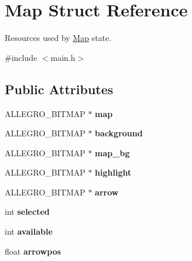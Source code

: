 \hypertarget{structMap}{\section{\-Map \-Struct \-Reference}
\label{structMap}
}


\-Resources used by \hyperlink{structMap}{\-Map} state.  




{\ttfamily \#include $<$main.\-h$>$}

\subsection*{\-Public \-Attributes}
\begin{DoxyCompactItemize}
\item 
\hypertarget{structMap_abaf70186fbb2b4b047b8350e3ec5347c}{\-A\-L\-L\-E\-G\-R\-O\-\_\-\-B\-I\-T\-M\-A\-P $\ast$ {\bfseries map}}\label{structMap_abaf70186fbb2b4b047b8350e3ec5347c}

\item 
\hypertarget{structMap_ad8340de76c0aef49c416f4314c15464f}{\-A\-L\-L\-E\-G\-R\-O\-\_\-\-B\-I\-T\-M\-A\-P $\ast$ {\bfseries background}}\label{structMap_ad8340de76c0aef49c416f4314c15464f}

\item 
\hypertarget{structMap_a36e0974add88da1c1c17062802c48559}{\-A\-L\-L\-E\-G\-R\-O\-\_\-\-B\-I\-T\-M\-A\-P $\ast$ {\bfseries map\-\_\-bg}}\label{structMap_a36e0974add88da1c1c17062802c48559}

\item 
\hypertarget{structMap_adccebcf55883a7b2a4d99df6f19be0e8}{\-A\-L\-L\-E\-G\-R\-O\-\_\-\-B\-I\-T\-M\-A\-P $\ast$ {\bfseries highlight}}\label{structMap_adccebcf55883a7b2a4d99df6f19be0e8}

\item 
\hypertarget{structMap_a90d5715479673c41e86f324d1955c2ad}{\-A\-L\-L\-E\-G\-R\-O\-\_\-\-B\-I\-T\-M\-A\-P $\ast$ {\bfseries arrow}}\label{structMap_a90d5715479673c41e86f324d1955c2ad}

\item 
\hypertarget{structMap_a07b3269191a003d517977da3adc7f0a4}{int {\bfseries selected}}\label{structMap_a07b3269191a003d517977da3adc7f0a4}

\item 
\hypertarget{structMap_aa000e129cf19d6d6d9a78cfce0ef58fc}{int {\bfseries available}}\label{structMap_aa000e129cf19d6d6d9a78cfce0ef58fc}

\item 
\hypertarget{structMap_a4f395f7bdf7bc0782e29e996e87237bb}{float {\bfseries arrowpos}}\label{structMap_a4f395f7bdf7bc0782e29e996e87237bb}


\end{DoxyCompactItemize}
